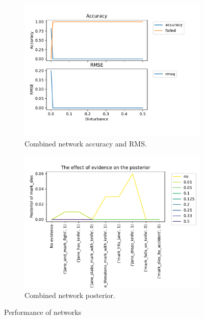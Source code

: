 \begin{enumerate}
\begin{figure}[htbp]
\begin{subfigure}{.5\textwidth}
\centering
\includegraphics[width=0.9\linewidth]{images/performance_KBFull.pdf}
\caption{Combined network accuracy and RMS.}
\label{fulla1}
\end{subfigure}%
\begin{subfigure}{.5\textwidth}
 \centering
\includegraphics[width=0.9\linewidth]{../experiments/VlekNetwork/plots/posterior_KBFull.pdf}
\caption{Combined network posterior.}
\label{fullp}
\end{subfigure}
\caption{Performance of networks}
\end{figure}


\end{enumerate}
